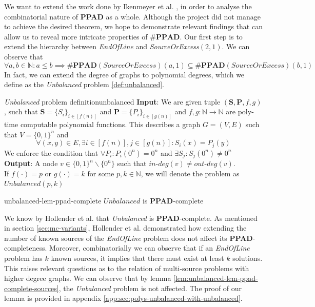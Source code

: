 We want to extend the work done by Ikenmeyer et al. \cite{ikenmeyer_WhatWhatNot_2022},
in order to analyse the combinatorial nature of \textbf{PPAD} as a whole.  Although the project
did not manage to achieve the desired theorem, we hope to demonstrate relevant findings that can allow
us to reveal more intricate properties of $\textbf{\#PPAD}$. Our first step is to extend the hierarchy
between \textit{EndOfLine} and \textit{SourceOrExcess}$(2,1)$. We can observe that
$$
    \forall a,b \in \mathbb{N}: a \leq b \implies \textbf{\#PPAD}(\textit{SourceOrExcess})(a,1) \subseteq
    \textbf{\#PPAD}(\textit{SourceOrExcess})(b,1)
$$
In fact, we can extend the degree of graphs to polynomial degrees,
which we define as the \textit{Unbalanced} problem \ref{def:unbalanced}.

\begin{definitionbox}{\textit{Unbalanced} problem definition}{unbalanced}
    \textbf{Input}: We are given tuple $(\textbf{S}, \textbf{P}, f, g)$, such that
    $\mathbf{S} = \{S_i\}_{i \in [f(n)]}$ and $\mathbf{P} = \{P_i\}_{i \in [g(n)]}$ and
    $f,g: \mathbb{N} \to \mathbb{N}$ are poly-time computable polynomial functions.
    This describes a graph $G = (V, E)$ such that $V = \{0,1\}^n$ and
    $$
        \forall (x,y) \in E, \exists i \in [f(n)],j \in [g(n)] : S_i(x) = P_j(y)
    $$
    We enforce the condition that $\forall P_i: P_i(0^n) = 0^n$ and $\exists S_j: S_j(0^n) \neq 0^n$\\
    \textbf{Output}: A node $v \in \{0,1\}^n \smallsetminus \{0^n\}$ such that $\textit{in-deg}(v) \neq \textit{out-deg}(v)$. \\
    If $f(\cdot) = p$ or  $g(\cdot) = k$ for some $p, k \in \mathbb{N}$, we will denote the problem as $\textit{Unbalanced}(p, k)$
\end{definitionbox}


\begin{lemmabox}{}{unbalanced-lem-ppad-complete}
    $\textit{Unbalanced}$ is \textbf{PPAD}-complete \cite{hollender_ComplexityMultisourceVariants_2018}
\end{lemmabox}
We know by Hollender et al. \cite{hollender_ComplexityMultisourceVariants_2018}
that \textit{Unbalanced} is \textbf{PPAD}-complete.
As  mentioned in section \ref{sec:mc-variants}, Hollender et al. \cite{hollender_ComplexityMultisourceVariants_2018}
demonstrated how extending the number of known sources of the \textit{EndOfLine} problem
does not affect its \textbf{PPAD}-completeness. Moreover,
combinatorially we can observe that if an \textit{EndOfLine}
problem has $k$ known sources, it implies that there must exist
at least $k$ solutions. This raises relevant questions as to
the relation of multi-source problems with higher degree graphs.
We can observe that by lemma \ref{lem:unbalanced-lem-ppad-complete-sources},
the \textit{Unbalanced} problem is not affected.
The proof of our lemma is provided in appendix \ref{app:sec:polys-unbalanced-with-unbalanced}.


